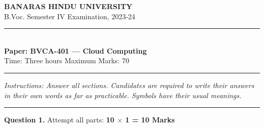 \documentclass[11pt,a4paper]{article}
\begin{document}
\begin{center}
  {\large\bfseries BANARAS HINDU UNIVERSITY}\\[2pt]
  {\normalsize B.Voc. Semester IV Examination, 2023-24}\\[6pt]
  \rule{0.8\linewidth}{0.5pt}\\[6pt]
  {\large\bfseries Paper: BVCA-401 --- Cloud Computing}\\[4pt]
  {\normalsize Time: Three hours \hfill Maximum Marks: 70}
\end{center}

\rule{\linewidth}{0.4pt}

\smallskip



\noindent   \textit{Instructions: Answer all sections. Candidates are required to write their answers in their own words as far as practicable. Symbols have their usual meanings.}

\bigskip




\rule{\linewidth}{0.4pt}\smallskip




\noindent   \textbf{Question 1.} Attempt all parts: \hfill   \textbf{10 $ \times$ 1 = 10 Marks}
\end{document}
